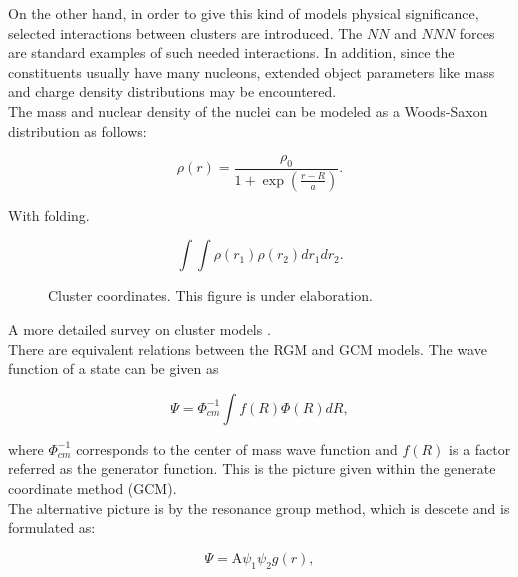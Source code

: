 \documentclass[openany]{book}
\begin{document}
On the other hand, in order to give this kind of models physical significance, selected interactions between clusters are introduced. The $NN$ and $NNN$ forces are standard examples of such needed interactions. In addition, since the constituents usually have many nucleons, extended object parameters like mass and charge density distributions may be encountered. \\

The mass and nuclear density of the nuclei can be modeled as a Woods-Saxon distribution as follows:

\begin{equation} \label{eq:micro_density}
	\rho(r) = \frac{\rho_0}{1 + \exp{\left(\frac{r - R}{a}\right)}}.
\end{equation} 

With folding.

\begin{equation}  \label{eq:micro_folding}
	\int \int \rho(r_1) \rho(r_2) dr_1 dr_2. 
\end{equation}

\begin{figure}[H]
	
	\caption[Cluster coordinates]{Cluster coordinates. This figure is under elaboration.}
	\label{fig:clusterCoordinates}
\end{figure}

A more detailed survey on cluster models \cite{beck_2012}. \\

There are equivalent relations between the RGM and GCM models. The wave function of a state can be given as

\begin{equation}\label{eq:micro_cluster_equivalency_RGM}
	\Psi = \Phi^{-1}_{cm} \int f(R) \Phi(R) dR,
\end{equation}

where $\Phi^{-1}_{cm}$ corresponds to the center of mass wave function and $f(R)$ is a factor referred as the generator function. This is the picture given within the generate coordinate method (GCM). \\

The alternative picture is by the resonance group method, which is descete and is formulated as:

\begin{equation}\label{eq:micro_cluster_equivalency_GCM}
	\Psi = \mathrm{A} \psi_1 \psi_2 g(r), 
\end{equation}
\end{document}
